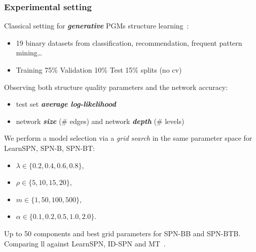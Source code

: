 \documentclass[xcolor={usenames,dvipsnames,svgnames}, compress]{beamer}
\begin{document}
\begin{frame}[t]
  \frametitle{Experimental setting}
  \footnotesize
  Classical setting for \emph{\textbf{generative}} PGMs
  structure learning~\emph{\parencite{Gens2013}}:
  \begin{itemize}
    \item 19 binary datasets from classification, recommendation,
    frequent pattern mining\dots~\emph{\parencite{Lowd2010}}~\emph{\parencite{Haaren2012}}
  \item Training 75\% Validation 10\% Test 15\%  splits (no cv)
  \end{itemize}

  Observing both structure quality parameters and the network
  accuracy:
  \begin{itemize}
   \item test set \emph{\textbf{average log-likelihood}}
   \item network \textbf{\emph{size}} (\# edges) and network \textbf{\emph{depth}} (\# levels)
  \end{itemize}
   
  We perform a model selection via a \textit{grid search} in the same parameter
  space for \textsf{LearnSPN}, \textsf{SPN-B}, \textsf{SPN-BT}:\\[-3pt]
  
    \begin{minipage}[t]{0.35\linewidth}
      \begin{itemize}
      \item \scriptsize$\lambda \in \{0.2, 0.4, 0.6, 0.8\}$,
      \item \scriptsize$\rho \in \{5, 10, 15, 20\}$, 
      \end{itemize}
    \end{minipage}\begin{minipage}[t]{0.5\linewidth}
      \begin{itemize}
      \item \scriptsize$m \in \{1, 50, 100, 500\}$, 
      \item \scriptsize$\alpha \in \{ 0.1, 0.2, 0.5, 1.0, 2.0\}$.
      \end{itemize}
    \end{minipage}

    Up to 50 components and best grid parameters for \textsf{SPN-BB} and \textsf{SPN-BTB}.
    Comparing ll against \textsf{LearnSPN},
    \textsf{ID-SPN} and \textsf{MT}~\emph{\parencite{Meila2000}}.

  \end{frame}
\end{document}
